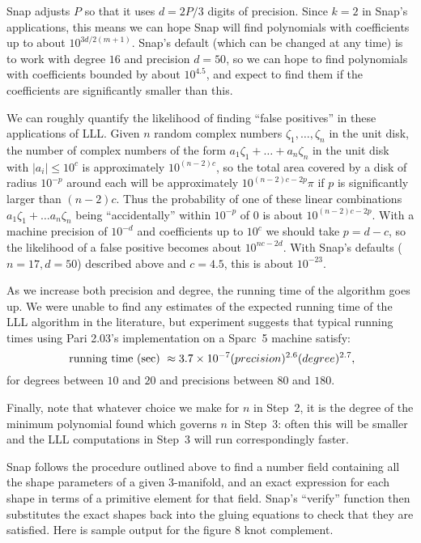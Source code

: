 \documentclass[a4paper]{amsart}
\theoremstyle{definition}
\begin{document}
Snap adjusts $P$ so that it uses $d=2P/3$ digits of precision.  Since
$k=2$ in Snap's applications, this means we can hope Snap will find
polynomials with coefficients up to about $10^{3d/2(m+1)}$.  Snap's
default (which can be changed at any time) is to work with degree $16$
and precision $d=50$, so we can hope to find polynomials with
coefficients bounded by about $10^{4.5}$, and expect to find them if the
coefficients are significantly smaller than this.

We can roughly quantify the likelihood of finding ``false positives''
in these applications of LLL. Given $n$ random complex numbers
$\zeta_1,\dots,\zeta_n$ in the unit disk, the number of complex
numbers of the form $a_1\zeta_1+\dots+a_n\zeta_n$ in the unit disk
with $|a_i|\le 10^c$ is approximately $10^{(n-2)c}$, so the total area
covered by a disk of radius $10^{-p}$ around each will be
approximately $10^{(n-2)c-2p}\pi$ if $p$ is significantly larger
than $(n-2)c$.  Thus the probability of one of these linear
combinations $a_1\zeta_1+\dots a_n\zeta_n$ being ``accidentally''
within $10^{-p}$ of $0$ is about $10^{(n-2)c-2p}$. With a machine
precision of $10^{-d}$ and coefficients up to $10^c$ we should take
$p=d-c$, so the likelihood of a false positive becomes about
$10^{nc-2d}$.  With Snap's defaults ($n=17, d=50$) described above and
$c=4.5$, this is about $10^{-23}$.

As we increase both precision and degree, the running time of the
algorithm goes up. 
We were unable to find any estimates of the expected
running time of the LLL algorithm in the literature, but experiment suggests
 that typical running times using Pari 2.03's implementation
on a Sparc~5 machine satisfy:
$${\rm~running~time~(sec)~}\approx 
3.7 \times 10^{-7} (precision)^{2.6} (degree)^{2.7},$$
for degrees between $10$ and $20$ and precisions between $80$ and $180$.

Finally, note that whatever choice we make for $n$ in Step~2,
it is the degree of the minimum polynomial found which governs $n$ in
Step~3: often this will be smaller and the LLL computations in Step~3
will run correspondingly faster.

Snap follows the procedure outlined above to find a number field
containing all the shape parameters of a given 3-manifold, and an
exact expression for each shape in terms of a primitive element for that
field. Snap's ``verify'' function then substitutes the exact shapes
back into the gluing equations to check that they are satisfied. Here
is sample output for the figure 8 knot complement. 
\end{document}
